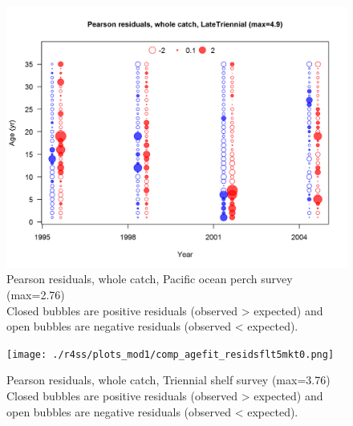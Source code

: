 \documentclass[12pt,]{article}
\begin{document}
\begin{figure}
\centering
\includegraphics{./r4ss/plots_mod1/comp_agefit_residsflt4mkt0.png}
\caption{Pearson residuals, whole catch, Pacific ocean perch survey
(max=2.76)\\
Closed bubbles are positive residuals (observed \textgreater{} expected)
and open bubbles are negative residuals (observed \textless{} expected).
\label{fig:pop_age_pearson}}
\end{figure}

\begin{figure}
\centering
\texttt{[image: ./r4ss/plots\_mod1/comp\_agefit\_residsflt5mkt0.png]}
\caption{Pearson residuals, whole catch, Triennial shelf survey
(max=3.76)\\
Closed bubbles are positive residuals (observed \textgreater{} expected)
and open bubbles are negative residuals (observed \textless{} expected).
\label{fig:tri_age_pearson}}
\end{figure}
\end{document}
